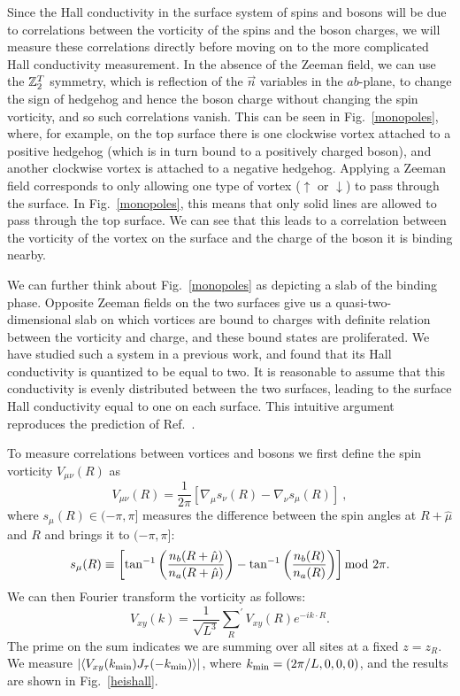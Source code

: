 Since the Hall conductivity in the surface system of spins and bosons will be due to correlations between the vorticity of the spins and the boson charges,\cite{FQHE} we will measure these correlations directly before moving on to the more complicated Hall conductivity measurement. 
In the absence of the Zeeman field, we can use the $\mathbb{Z}_2^T$ symmetry, which is reflection of the $\vec n$ variables in the $ab$-plane, to change the sign of hedgehog and hence the boson charge without changing the spin vorticity, and so such correlations vanish. This can be seen in Fig.~\ref{monopoles}, where, for example, on the top surface there is one clockwise vortex attached to a positive hedgehog (which is in turn bound to a positively charged boson), and another clockwise vortex is attached to a negative hedgehog. Applying a Zeeman field corresponds to only allowing one type of vortex ($\uparrow$ or $\downarrow$) to pass through the surface. In Fig.~\ref{monopoles}, this means that only solid lines are allowed to pass through the top surface. We can see that this leads to a correlation between the vorticity of the vortex on the surface and the charge of the boson it is binding nearby. 

We can further think about Fig.~\ref{monopoles} as depicting a slab of the binding phase. Opposite Zeeman fields on the two surfaces give us a quasi-two-dimensional slab on which vortices are bound to charges with definite relation between the vorticity and charge, and these bound states are proliferated. We have studied such a system in a previous work,\cite{FQHE} and found that its Hall conductivity is quantized to be equal to two. It is reasonable to assume that this conductivity is evenly distributed between the two surfaces, leading to the surface Hall conductivity equal to one on each surface. This intuitive argument reproduces the prediction of Ref.~\cite{SenthilVishwanath}.

To measure correlations between vortices and bosons we first define the spin vorticity $V_{\mu\nu}(R)$ as
\begin{equation}
V_{\mu\nu}(R) = \frac{1}{2\pi}[\nabla_\mu s_{\nu}(R) - \nabla_\nu s_{\mu}(R)] ~,
\label{Vmn}
\end{equation}
where $s_\mu(R) \in (-\pi, \pi]$ measures the difference between the spin angles at $R+\hat{\mu}$ and $R$ and brings it to $(-\pi,\pi]$:
\begin{equation}
s_{\mu}(R)\equiv \left[\tan^{-1}\left(\frac{n_b(R+\hat{\mu})}{n_a(R+\hat{\mu})}\right) -\tan^{-1}\left(\frac{n_b(R)}{n_a(R)}\right)\right]{\rm mod}~2\pi.\nonumber
\end{equation}
We can then Fourier transform the vorticity as follows:
\begin{equation}
V_{xy}(k) = \frac{1}{\sqrt{L^3}}{\sum_{R}}^\prime V_{xy}(R) e^{-ik\cdot R}.
\end{equation}
The prime on the sum indicates we are summing over all sites at a fixed $z=z_R$. We measure $\left|\langle V_{xy}(k_{\rm min})J_\tau(-k_{\rm min})\rangle\right|$, where $k_{\rm min}=(2\pi/L,0,0,0)$, and the results are shown in Fig.~\ref{heishall}. 

